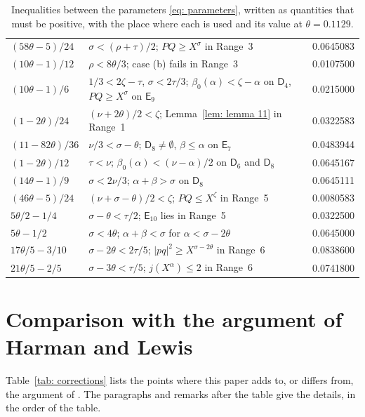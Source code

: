 \documentclass{article}
\numberwithin{equation}{section}
\newcommand{\Le}{\leqslant}
\newcommand{\Ge}{\geqslant}
\begin{document}
\begin{table}[ht]
\begin{tabular}{llc}
$(58\theta - 5)/24$ & $\sigma < (\rho + \tau)/2$; $PQ \Ge X^{\sigma}$ in Range~3 & 0.0645083 \\
$(10\theta - 1)/12$ & $\rho < 8\theta/3$; case (b) fails in Range~3 & 0.0107500 \\
$(10\theta - 1)/6$ & $1/3 < 2\zeta - \tau$, $\sigma < 2\tau/3$; $\beta_0(\alpha) < \zeta - \alpha$ on $\mathsf{D}_4$, $PQ \Ge X^{\sigma}$ on $\mathsf{E}_9$ & 0.0215000 \\
$(1 - 2\theta)/24$ & $(\nu + 2\theta)/2 < \zeta$; Lemma~\ref{lem: lemma 11} in Range~1 & 0.0322583 \\
$(11 - 82\theta)/36$ & $\nu/3 < \sigma - \theta$; $\mathsf{D}_8 \neq \emptyset$, $\beta \Le \alpha$ on $\mathsf{E}_7$ & 0.0483944 \\
$(1 - 2\theta)/12$ & $\tau < \nu$; $\beta_0(\alpha) < (\nu - \alpha)/2$ on $\mathsf{D}_6$ and $\mathsf{D}_8$ & 0.0645167 \\
$(14\theta - 1)/9$ & $\sigma < 2\nu/3$; $\alpha + \beta > \sigma$ on $\mathsf{D}_8$ & 0.0645111 \\
$(46\theta - 5)/24$ & $(\nu + \sigma - \theta)/2 < \zeta$; $PQ \Le X^{\zeta}$ in Range~5 & 0.0080583 \\
$5\theta/2 - 1/4$ & $\sigma - \theta < \tau/2$; $\mathsf{E}_{10}$ lies in Range~5 & 0.0322500 \\
$5\theta - 1/2$ & $\sigma < 4\theta$; $\alpha + \beta < \sigma$ for $\alpha < \sigma - 2\theta$ & 0.0645000 \\
$17\theta/5 - 3/10$ & $\sigma - 2\theta < 2\tau/5$; $|pq|^2 \Ge X^{\sigma - 2\theta}$ in Range~6 & 0.0838600 \\
$21\theta/5 - 2/5$ & $\sigma - 3\theta < \tau/5$; $j(X^{\alpha}) \Le 2$ in Range~6 & 0.0741800 \\
\bottomrule
\end{tabular}
\caption{Inequalities between the parameters \eqref{eq: parameters}, written as quantities that must be positive, with the place where each is used and its value at $\theta = 0.1129$.}
\label{tab: inequalities}
\end{table}

\section{Comparison with the argument of Harman and Lewis}
\label{app: comparison}

Table~\ref{tab: corrections} lists the points where this paper adds to, or differs from, the argument of \citet{harman2001gaussian}. The paragraphs and remarks after the table give the details, in the order of the table.
\end{document}
